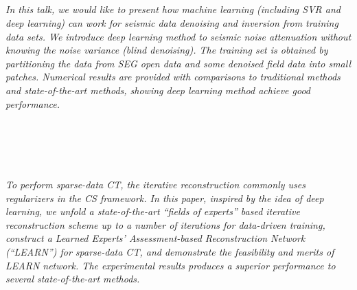 \begin{multicols}{2}
        \\\\
        \\
        \\\\
        \\
        \\\\
\\
      \textit{In this talk, we would like to present how machine learning (including SVR and deep learning) can work for seismic data denoising and inversion from training data sets. We introduce deep learning method to seismic noise attenuation without knowing the noise variance (blind denoising). The training set is obtained by partitioning the data from SEG open data and some denoised field data into small patches. Numerical results are provided with comparisons to traditional methods and state-of-the-art methods, showing deep learning method achieve good performance.}\\
\\ 
        \\
        \\\\
\\
      \textit{To perform sparse-data CT, the iterative reconstruction commonly uses regularizers in the CS framework. In this paper, inspired by the idea of deep learning, we unfold a state-of-the-art “fields of experts” based iterative reconstruction scheme up to a number of iterations for data-driven training, construct a Learned Experts’ Assessment-based Reconstruction Network (“LEARN”) for sparse-data CT, and demonstrate the feasibility and merits of LEARN network. The experimental results produces a superior performance  to several state-of-the-art methods.}\\
\\ 
        \\
        \\\\
        \\
        \\\\
        \\
        \\\\

\end{multicols}
